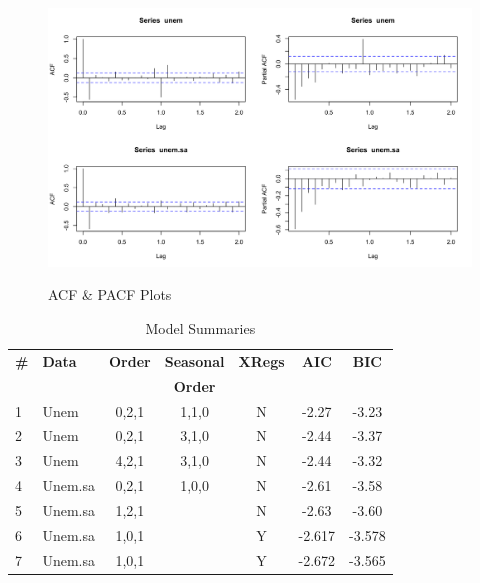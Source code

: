 {   \begin{figure}[H]
      	\centering
      	\caption{ACF \& PACF Plots}
      	\includegraphics[width=\linewidth]{images/acfpacf}
      	\label{fig:secdiff2}
      \end{figure}
  
     	\begin{table}[H]
     		\centering
     		\caption{Model Summaries}
     		     		\label{tab:models}
     		\begin{tabular}{llccccc}
     			\hline
     			\textbf{\#}& \textbf{Data}  & \textbf{Order} & \textbf{Seasonal} & \textbf{XRegs} & \textbf{AIC} & \textbf{BIC} \\
     			&&&\textbf{Order}&&&\\ 
     			\hline
     			1 & Unem  & 0,2,1 & 1,1,0 & N & -2.27 & -3.23 \\ 
     			2 & Unem  & 0,2,1 & 3,1,0 & N & -2.44 & -3.37 \\ 
     			3 & Unem  & 4,2,1 & 3,1,0 & N & -2.44 & -3.32 \\ 
     			4 & Unem.sa & 0,2,1 & 1,0,0 & N & -2.61 & -3.58 \\ 
     			5 & Unem.sa & 1,2,1 &  & N & -2.63 & -3.60 \\ 
     			6 & Unem.sa & 1,0,1 &  & Y & -2.617 &  -3.578 \\ 
     			7 & Unem.sa & 1,0,1 & & Y& -2.672 &  -3.565\\ \hline
     		\end{tabular}
     	\end{table}

		
}
